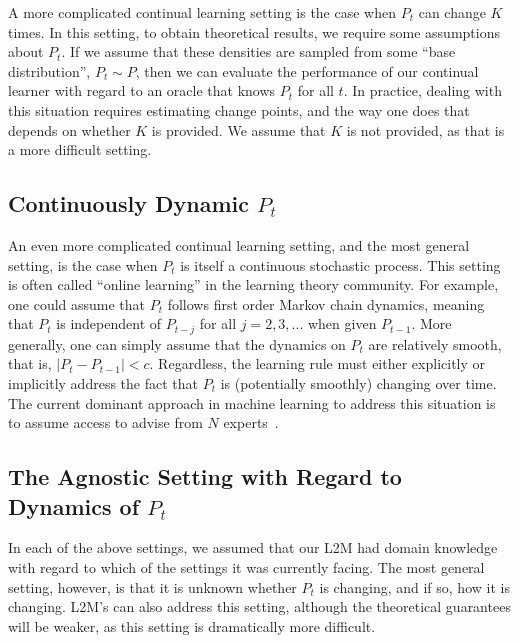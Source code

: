 \documentclass{article}
\begin{document}
A more complicated continual learning setting is the case when $P_t$ can change $K$ times.  In this setting, to obtain theoretical results, we require some assumptions about $P_t$.  If we assume that these densities are sampled from some ``base distribution'', $P_t \sim P$, then we can evaluate the performance of our continual learner with regard to an oracle that knows $P_t$ for all $t$. In practice, dealing with this situation requires estimating change points, and the way one does that depends on whether $K$ is provided.  We assume that $K$ is not provided, as that is a more difficult setting.  





\subsection{Continuously Dynamic $P_t$}
\label{sec:smooth}

An even more complicated continual learning setting, and the most general setting, is the case when $P_t$ is itself a continuous stochastic process.  This setting is often called ``online learning'' in the learning theory community. For example, one could assume that $P_t$ follows  first order Markov chain dynamics, meaning that $P_t$ is independent of $P_{t-j}$  for all $j=2,3,...$ when given $P_{t-1}$.  More generally, one can simply assume that the dynamics on $P_t$ are relatively smooth, that is, $|P_t - P_{t-1}| < c$.  Regardless, the learning rule must either explicitly or implicitly address the fact that $P_t$ is (potentially smoothly) changing over time.  The current dominant approach in machine learning to address this situation is to assume access to advise from $N$ experts~\cite{Mohri2012}. 






\subsection{The Agnostic Setting with Regard to Dynamics of $P_t$}
\label{sec:combo}


In each of the above settings, we assumed that our L2M had domain knowledge with regard to which of the  settings it was currently facing.  The most general setting, however, is that it is unknown whether $P_t$ is changing, and if so, how it is changing.  L2M's can also address this setting, although the theoretical guarantees will be weaker, as this setting is dramatically more difficult.  
\end{document}
